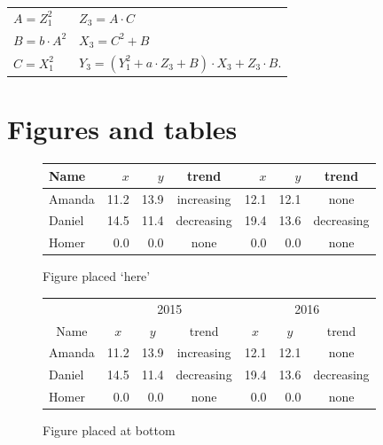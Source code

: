 \documentclass[a4paper,10pt]{article}
\begin{document}
\ \\
\ \\


\begin{center}
\begin{tabular}{l l}
  $A = Z_1^2$			&	$Z_3 = A\cdot C$ \\
  $B = b\cdot A^2$	&	$X_3 = C^2 + B$\\
  $C = X_1^2$			&  $Y_3 = (Y_1^2 + a\cdot Z_3 + B)\cdot X_3 + Z_3\cdot B$.
\end{tabular}
\end{center}


\pagebreak
\section*{Figures and tables}

\begin{figure}
\label{figure:here}
\begin{center}
\begin{tabular}{l | r r c | r r c }
\hline
\hline
  Name  & $x$ & $y$ & trend & $x$ & $y$ & trend \\
\hline
  Amanda  & 11.2 & 13.9 & increasing & 12.1 & 12.1 & none \\
  Daniel  & 14.5 & 11.4 & decreasing & 19.4 & 13.6 & decreasing \\
  Homer   &  0.0 &  0.0 & none       &  0.0 &  0.0 & none \\
\hline
\hline
\end{tabular}
\caption{Figure placed `here'}
\end{center}
\end{figure}

\begin{figure}[b!]
\label{figure:bottom}
\begin{center}
\begin{tabular}{l | r r c | r r c } \hline
  \multicolumn{1}{c}{}& \multicolumn{3}{c}{2015} & \multicolumn{3}{c}{2016} \\
  \multicolumn{1}{c}{Name}
  & \multicolumn{1}{c}{$x$} & \multicolumn{1}{c}{$y$} & \multicolumn{1}{c}{trend}
  & \multicolumn{1}{c}{$x$} & \multicolumn{1}{c}{$y$} & \multicolumn{1}{c}{trend} \\
  \hline
  Amanda  & 11.2 & 13.9 & increasing & 12.1 & 12.1 & none \\
  Daniel  & 14.5 & 11.4 & decreasing & 19.4 & 13.6 & decreasing \\
  Homer   &  0.0 &  0.0 & none       &  0.0 &  0.0 & none \\
\hline
\end{tabular}
\caption{Figure placed at bottom}
\end{center}
\end{figure}
\end{document}
